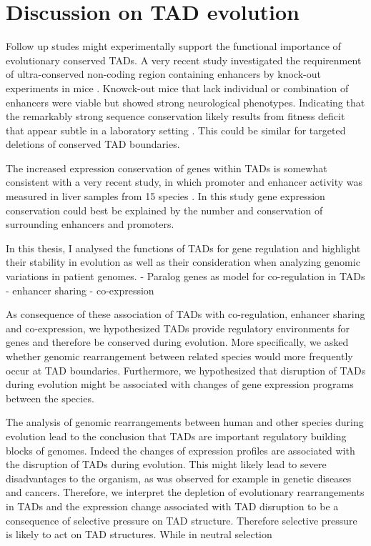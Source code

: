 \documentclass[a4paper,twoside=true,openright,parskip=full,chapterprefix=true,11pt,headings=normal,bibliography=totoc,listof=totoc,titlepage=on,captions=tableabove,draft=false]{scrreprt}
\theoremstyle{definition}
\theoremstyle{definition}
\theoremstyle{definition}
\theoremstyle{remark}
\begin{document}
\hypertarget{discussion-on-tad-evolution}{%
\section{Discussion on TAD
evolution}\label{discussion-on-tad-evolution}}

Follow up studes might experimentally support the functional importance
of evolutionary conserved TADs. A very recent study investigated the
requirenment of ultra-conserved non-coding region containing enhancers
by knock-out experiments in mice \citep{Dickel2018}. Knowck-out mice
that lack individual or combination of enhancers were viable but showed
strong neurological phenotypes. Indicating that the remarkably strong
sequence conservation likely results from fitness deficit that appear
subtle in a laboratory setting \citep{Dickel2018}. This could be similar
for targeted deletions of conserved TAD boundaries.

The increased expression conservation of genes within TADs is somewhat
consistent with a very recent study, in which promoter and enhancer
activity was measured in liver samples from 15 species
\citep{Berthelot2017}. In this study gene expression conservation could
best be explained by the number and conservation of surrounding
enhancers and promoters.

In this thesis, I analysed the functions of TADs for gene regulation and
highlight their stability in evolution as well as their consideration
when analyzing genomic variations in patient genomes. - Paralog genes as
model for co-regulation in TADs - enhancer sharing - co-expression

As consequence of these association of TADs with co-regulation, enhancer
sharing and co-expression, we hypothesized TADs provide regulatory
environments for genes and therefore be conserved during evolution. More
specifically, we asked whether genomic rearrangement between related
species would more frequently occur at TAD boundaries. Furthermore, we
hypothesized that disruption of TADs during evolution might be
associated with changes of gene expression programs between the species.

The analysis of genomic rearrangements between human and other species
during evolution lead to the conclusion that TADs are important
regulatory building blocks of genomes. Indeed the changes of expression
profiles are associated with the disruption of TADs during evolution.
This might likely lead to severe disadvantages to the organism, as was
observed for example in genetic diseases
\citep{Ibn-Salem2014, Lupianez2015} and cancers. Therefore, we interpret
the depletion of evolutionary rearrangements in TADs and the expression
change associated with TAD disruption to be a consequence of selective
pressure on TAD structure. Therefore selective pressure is likely to act
on TAD structures. While in neutral selection
\end{document}
